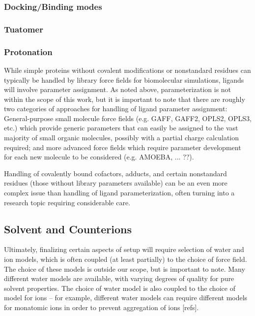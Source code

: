 \documentclass[9pt,bestpractices]{livecoms}
\begin{document}
\subsubsection{Docking/Binding modes}

\subsubsection{Tuatomer}

\subsubsection{Protonation}
While simple proteins without covalent modifications or nonstandard residues can typically be handled by library force fields for biomolecular simulations, ligands will involve parameter assignment.
As noted above, parameterization is not within the scope of this work, but it is important to note that there are roughly two categories of approaches for handling of ligand parameter assignment: 
General-purpose small molecule force fields (e.g. GAFF, GAFF2, OPLS2, OPLS3, etc.) %
which provide generic parameters that can easily be assigned to the vast majority of small organic molecules, possibly with a partial charge calculation required; and more advanced force fields which require parameter development for each new molecule to be considered (e.g. AMOEBA, ... ??). 

Handling of covalently bound cofactors, adducts, and certain nonstandard residues (those without library parameters available) can be an even more complex issue than handling of ligand parameterization, often turning into a research topic requiring considerable care. 

\subsection{Solvent and Counterions}%
\label{sec:stage3}%
%
Ultimately, finalizing certain aspects of setup will require selection of water and ion models, which is often coupled (at least partially) to the choice of force field.%
The choice of these models is outside our scope, but is important to note. %
Many different water models are available, with varying degrees of quality for pure solvent properties.%
The choice of water model is also coupled to the choice of model for ions -- for example, different water models can require different models for monatomic ions in order to prevent aggregation of ions [refs].%
%
\end{document}
